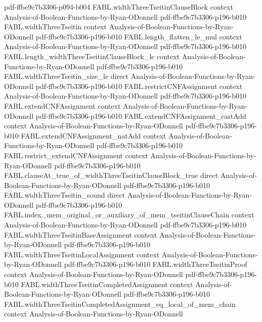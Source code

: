 \begin{theorem}
  {pdf-ffbe9c7b3306-p094-b004}
\proofstep
  {FABL.widthThreeTseitinClauseBlock}
  {context}
  {Analysis-of-Boolean-Functions-by-Ryan-ODonnell}
  {pdf-ffbe9c7b3306-p196-b010}
\proofstep
  {FABL.widthThreeTseitin}
  {context}
  {Analysis-of-Boolean-Functions-by-Ryan-ODonnell}
  {pdf-ffbe9c7b3306-p196-b010}
\proofstep
  {FABL.length_flatten_le_mul}
  {context}
  {Analysis-of-Boolean-Functions-by-Ryan-ODonnell}
  {pdf-ffbe9c7b3306-p196-b010}
\proofstep
  {FABL.length_widthThreeTseitinClauseBlock_le}
  {context}
  {Analysis-of-Boolean-Functions-by-Ryan-ODonnell}
  {pdf-ffbe9c7b3306-p196-b010}
\proofstep
  {FABL.widthThreeTseitin_size_le}
  {direct}
  {Analysis-of-Boolean-Functions-by-Ryan-ODonnell}
  {pdf-ffbe9c7b3306-p196-b010}
\proofstep
  {FABL.restrictCNFAssignment}
  {context}
  {Analysis-of-Boolean-Functions-by-Ryan-ODonnell}
  {pdf-ffbe9c7b3306-p196-b010}
\proofstep
  {FABL.extendCNFAssignment}
  {context}
  {Analysis-of-Boolean-Functions-by-Ryan-ODonnell}
  {pdf-ffbe9c7b3306-p196-b010}
\proofstep
  {FABL.extendCNFAssignment_castAdd}
  {context}
  {Analysis-of-Boolean-Functions-by-Ryan-ODonnell}
  {pdf-ffbe9c7b3306-p196-b010}
\proofstep
  {FABL.extendCNFAssignment_natAdd}
  {context}
  {Analysis-of-Boolean-Functions-by-Ryan-ODonnell}
  {pdf-ffbe9c7b3306-p196-b010}
\proofstep
  {FABL.restrict_extendCNFAssignment}
  {context}
  {Analysis-of-Boolean-Functions-by-Ryan-ODonnell}
  {pdf-ffbe9c7b3306-p196-b010}
\proofstep
  {FABL.clauseAt_true_of_widthThreeTseitinClauseBlock_true}
  {direct}
  {Analysis-of-Boolean-Functions-by-Ryan-ODonnell}
  {pdf-ffbe9c7b3306-p196-b010}
\proofstep
  {FABL.widthThreeTseitin_sound}
  {direct}
  {Analysis-of-Boolean-Functions-by-Ryan-ODonnell}
  {pdf-ffbe9c7b3306-p196-b010}
\proofstep
  {FABL.index_mem_original_or_auxiliary_of_mem_tseitinClauseChain}
  {context}
  {Analysis-of-Boolean-Functions-by-Ryan-ODonnell}
  {pdf-ffbe9c7b3306-p196-b010}
\proofstep
  {FABL.widthThreeTseitinBaseAssignment}
  {context}
  {Analysis-of-Boolean-Functions-by-Ryan-ODonnell}
  {pdf-ffbe9c7b3306-p196-b010}
\proofstep
  {FABL.widthThreeTseitinLocalAssignment}
  {context}
  {Analysis-of-Boolean-Functions-by-Ryan-ODonnell}
  {pdf-ffbe9c7b3306-p196-b010}
\proofstep
  {FABL.widthThreeTseitinProof}
  {context}
  {Analysis-of-Boolean-Functions-by-Ryan-ODonnell}
  {pdf-ffbe9c7b3306-p196-b010}
\proofstep
  {FABL.widthThreeTseitinCompletedAssignment}
  {context}
  {Analysis-of-Boolean-Functions-by-Ryan-ODonnell}
  {pdf-ffbe9c7b3306-p196-b010}
\proofstep
  {FABL.widthThreeTseitinCompletedAssignment_eq_local_of_mem_chain}
  {context}
  {Analysis-of-Boolean-Functions-by-Ryan-ODonnell}

\end{theorem}
